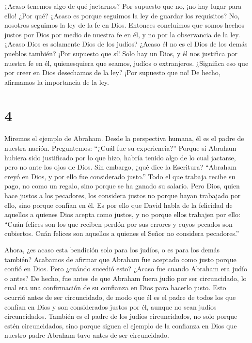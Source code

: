  ¿Acaso tenemos algo de qué jactarnos? Por supuesto que no,
¡no hay lugar para ello! ¿Por qué? ¿Acaso es porque seguimos la ley de
guardar los requisitos? No, nosotros seguimos la ley de la fe en Dios.
 Entonces concluimos que somos hechos justos por Dios por
medio de nuestra fe en él, y no por la observancia de la ley.
 ¿Acaso Dios es solamente Dios de los judíos? ¿Acaso él no
es el Dios de los demás pueblos también? ¡Por supuesto que sí!
 Solo hay un Dios, y él nos justifica por nuestra fe en él,
quienesquiera que seamos, judíos o extranjeros.  ¿Significa
eso que por creer en Dios desechamos de la ley? ¡Por supuesto que no! De
hecho, afirmamos la importancia de la ley.

\hypertarget{section-3}{%
\section{4}\label{section-3}}

 Miremos el ejemplo de Abraham. Desde la perspectiva humana,
él es el padre de nuestra nación. Preguntemos: ``¿Cuál fue su
experiencia?''  Porque si Abraham hubiera sido justificado
por lo que hizo, habría tenido algo de lo cual jactarse, pero no ante
los ojos de Dios.  Sin embargo, ¿qué dice la Escritura?
``Abraham creyó en Dios, y por ello fue considerado justo.''
 Todo el que trabaja recibe su pago, no como un regalo, sino
porque se ha ganado su salario.  Pero Dios, quien hace
justos a los pecadores, los considera justos no porque hayan trabajado
por ello, sino porque confían en él.  Es por ello que David
habla de la felicidad de aquellos a quienes Dios acepta como justos, y
no porque ellos trabajen por ello:  ``Cuán felices son los
que reciben perdón por sus errores y cuyos pecados son cubiertos.
 Cuán felices son aquellos a quienes el Señor no considera
pecadores.''

 Ahora, ¿es acaso esta bendición solo para los judíos, o es
para los demás también? Acabamos de afirmar que Abraham fue aceptado
como justo porque confió en Dios.  Pero ¿cuándo sucedió
esto? ¿Acaso fue cuando Abraham era judío o antes?  De
hecho, fue antes de que Abraham fuera judío por ser circuncidado, lo
cual era una confirmación de su confianza en Dios para hacerlo justo.
Esto ocurrió antes de ser circuncidado, de modo que él es el padre de
todos los que confían en Dios y son considerados justos por él, aunque
no sean judíos circuncidados.  También es el padre de los
judíos circuncidados, no solo porque estén circuncidados, sino porque
siguen el ejemplo de la confianza en Dios que nuestro padre Abraham tuvo
antes de ser circuncidado.

